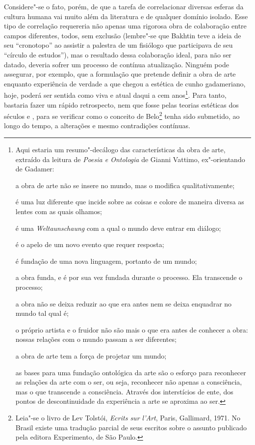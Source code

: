 Considere"-se o fato, porém, de que a tarefa de correlacionar diversas
esferas da cultura humana vai muito além da literatura e de qualquer
domínio isolado. Esse tipo de correlação requereria não apenas uma
rigorosa obra de colaboração entre campos diferentes, todos, sem
exclusão (lembre"-se que Bakhtin teve a ideia de seu ``cronotopo'' ao
assistir a palestra de um fisiólogo que participava de seu ``círculo de
estudos''), mas o resultado dessa colaboração ideal, para não ser
datado, deveria sofrer um processo de contínua atualização. Ninguém pode
assegurar, por exemplo, que a formulação que pretende definir a obra de
arte enquanto experiência de verdade a que chegou a estética de cunho
gadameriano, hoje, poderá ser sentida como viva e atual daqui a cem
anos\footnote{Aqui estaria um resumo"-decálogo das características da
  obra de arte, extraído da leitura de \emph{Poesia e Ontologia} de
  Gianni Vattimo, ex"-orientando de Gadamer:

  a obra de arte não se insere no mundo, mas o modifica
  qualitativamente;

  é uma luz diferente que incide sobre as coisas e colore de maneira
  diversa as lentes com as quais olhamos;

  é uma \emph{Weltaunschaung} com a qual o mundo deve entrar em diálogo;

  é o apelo de um novo evento que requer resposta;

  é fundação de uma nova linguagem, portanto de um mundo;

  a obra funda, e é por sua vez fundada durante o processo. Ela
  transcende o processo;

  a obra não se deixa reduzir ao que era antes nem se deixa enquadrar no
  mundo tal qual é;

  o próprio artista e o fruidor não são mais o que era antes de
  conhecer a obra: nossas relações com o mundo passam a ser diferentes;

  a obra de arte tem a força de projetar um mundo;

  as bases para uma fundação ontológica da arte são o esforço para
  reconhecer as relações da arte com o ser, ou seja, reconhecer não
  apenas a consciência, mas o que transcende a consciência. Através dos
  interstícios de ente, dos pontos de descontinuidade da experiência a
  arte se aproxima ao ser.}. Para tanto, bastaria fazer um rápido
retrospecto, nem que fosse pelas teorias estéticas dos séculos  e ,
para se verificar como o conceito de Belo\footnote{Leia"-se o livro de
  Lev Tolstói, \emph{Ecrits sur l'Art}, Paris, Gallimard, 1971. No
  Brasil existe uma tradução parcial de seus escritos sobre o assunto
  publicado pela editora Experimento, de São Paulo.} tenha sido
submetido, ao longo do tempo, a alterações e mesmo contradições
contínuas.

